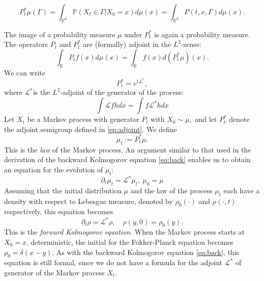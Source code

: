 \documentclass{article}
\begin{document}
\begin{equation}
P_t^*\mu(\Gamma) = \int_{\mathbb{R}^d} \mathbb{P}(X_t \in \Gamma|X_0=x)d\mu(x)=\int_{\mathbb{R}^d} P(t,x,\Gamma)d\mu(x). \label{eq:adjoint}
\end{equation}


The image of a probability measure $\mu$ under $P_t^*$ is again a probability measure. The operators $P_t$ and $P_t^*$ are (formally) adjoint in the $L^2$-sense:
\begin{equation}
    \int_{\mathbb{R}}P_tf(x)d\mu(x) = \int_{\mathbb{R}} f(x) d(P_t^*\mu)(x).
\end{equation}
We can write
$$P_t^* = e^{t\mathcal{L}^*},$$
where $\mathcal{L}^*$is the $L^2$-adjoint of the generator of the process:
$$\int\mathcal{L}fhdx=\int f \mathcal{L}^* h dx$$
Let $X_t$ be a Markov process with generator $P_t$ with $X_0 \sim  \mu,$ and let $P_t^*$ denote the adjoint semigroup defined in \eqref{eq:adjoint}. We define
$$\mu_t:=P_t^*\mu.$$
This is the \textit{law} of the Markov process. An argument similar to that used in the derivation of the backward Kolmogorov equation \eqref{eq:back} enables us to obtain an equation for the evolution of $\mu_t$: 
\begin{equation}
    \partial_t \mu_t = \mathcal{L}^* \mu_t, \ \mu_0=\mu
\end{equation}
Assuming that the initial distribution $\mu$ and the law of the process $\mu_t$ each have a density with respect to Lebesgue measure, denoted by $\rho_0(\cdot)$ and $\rho(\cdot,t)$ respectively, this equation becomes 
\begin{equation}
    \partial_t \rho =\mathcal{L}^*\rho, \quad \rho(y,0)=\rho_0(y).
    \label{eq:forward}
\end{equation}
This is the \textit{forward Kolmogorov equation}. When the Markov process starts at $X_0=x$, deterministic, the initial for the Fokker-Planck equation becomes $\rho_0 = \delta(x-y)$. As with the backward Kolmogorov equation \eqref{eq:back}, this equation is still formal, since we do not have a formula for the adjoint $\mathcal{L}^*$ of generator of the Markov process $X_t$.
\end{document}
